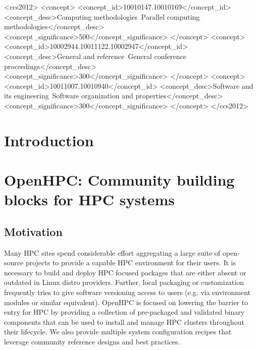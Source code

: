 \documentclass{sig-alternate-05-2015}
\begin{document}
%
%
\begin{CCSXML}
<ccs2012>
<concept>
<concept_id>10010147.10010169</concept_id>
<concept_desc>Computing methodologies~Parallel computing
methodologies</concept_desc>
<concept_significance>500</concept_significance>
</concept>
<concept>
<concept_id>10002944.10011122.10002947</concept_id>
<concept_desc>General and reference~General conference
proceedings</concept_desc>
<concept_significance>300</concept_significance>
</concept>
<concept>
<concept_id>10011007.10010940</concept_id>
<concept_desc>Software and its engineering~Software organization and properties</concept_desc>
<concept_significance>300</concept_significance>
</concept>
</ccs2012>
\end{CCSXML}



%
%

%
%
\printccsdesc



\section{Introduction}

\section{OpenHPC: Community building blocks for HPC systems}

\subsection{Motivation}
Many HPC sites spend considerable effort aggregating a large suite of 
open-source projects to provide a capable HPC environment for their users.
It is necessary to build and deploy HPC focused packages that are either absent
or outdated in Linux distro providers. Further, local packaging or 
customization frequently tries to give software versioning access to users (e.g.
via environment modules or similar equivalent). OpenHPC is focused on 
lowering the barrier to entry for HPC by providing a collection of 
pre-packaged and validated binary components that can be used to install 
and manage HPC clusters throughout their lifecycle. We also provide multiple 
system configuration recipes that leverage community reference designs and best 
practices.
\end{document}

